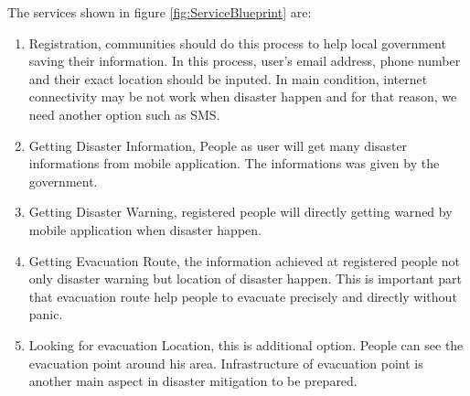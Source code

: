 The services shown in figure \ref{fig:ServiceBlueprint} are:
\begin{enumerate}
\setlength{\itemsep}{1.5pt}
\setlength{\parskip}{1.5pt}
\item Registration, communities should do this process to help local government saving their information. In this process, user's email address, phone number and their exact location should be inputed. In main condition, internet connectivity may be not work when disaster happen and for that reason, we need another option such as SMS.
\item Getting Disaster Information, People as user will get many disaster informations from mobile application. The informations was given by the government. 
\item Getting Disaster Warning, registered people will directly getting warned by mobile application when disaster happen. 
\item Getting Evacuation Route, the information achieved at registered people not only disaster warning but location of disaster happen. This is important part that evacuation route help people to evacuate precisely and directly without panic.
\item Looking for evacuation Location, this is additional option. People can see the evacuation point around his area. Infrastructure of evacuation point is another main aspect in disaster mitigation to be prepared.
\end{enumerate}

